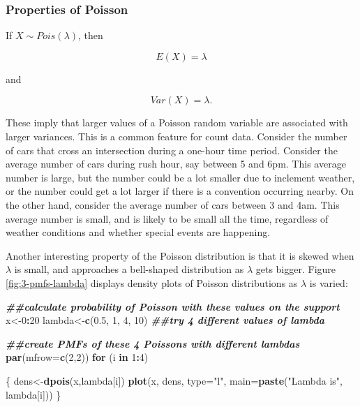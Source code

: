 \documentclass[
]{book}
\newenvironment{Shaded}{\begin{snugshade}}{\end{snugshade}}
\newcommand{\AttributeTok}[1]{\textcolor[rgb]{0.13,0.29,0.53}{#1}}
\newcommand{\ControlFlowTok}[1]{\textcolor[rgb]{0.13,0.29,0.53}{\textbf{#1}}}
\newcommand{\DecValTok}[1]{\textcolor[rgb]{0.00,0.00,0.81}{#1}}
\newcommand{\DocumentationTok}[1]{\textcolor[rgb]{0.56,0.35,0.01}{\textbf{\textit{#1}}}}
\newcommand{\FloatTok}[1]{\textcolor[rgb]{0.00,0.00,0.81}{#1}}
\newcommand{\FunctionTok}[1]{\textcolor[rgb]{0.13,0.29,0.53}{\textbf{#1}}}
\newcommand{\NormalTok}[1]{#1}
\newcommand{\OtherTok}[1]{\textcolor[rgb]{0.56,0.35,0.01}{#1}}
\newcommand{\SpecialCharTok}[1]{\textcolor[rgb]{0.81,0.36,0.00}{\textbf{#1}}}
\newcommand{\StringTok}[1]{\textcolor[rgb]{0.31,0.60,0.02}{#1}}
\begin{document}
\hypertarget{properties-of-poisson}{%
\subsubsection{Properties of Poisson}\label{properties-of-poisson}}

If \(X \sim Pois(\lambda)\), then

\begin{equation} 
E(X) = \lambda
\label{eq:3-pois-EX}
\end{equation}

and

\begin{equation} 
Var(X) = \lambda.
\label{eq:3-pois-var}
\end{equation}

These imply that larger values of a Poisson random variable are associated with larger variances. This is a common feature for count data. Consider the number of cars that cross an intersection during a one-hour time period. Consider the average number of cars during rush hour, say between 5 and 6pm. This average number is large, but the number could be a lot smaller due to inclement weather, or the number could get a lot larger if there is a convention occurring nearby. On the other hand, consider the average number of cars between 3 and 4am. This average number is small, and is likely to be small all the time, regardless of weather conditions and whether special events are happening.

Another interesting property of the Poisson distribution is that it is skewed when \(\lambda\) is small, and approaches a bell-shaped distribution as \(\lambda\) gets bigger. Figure \ref{fig:3-pmfs-lambda} displays density plots of Poisson distributions as \(\lambda\) is varied:

\begin{Shaded}
\begin{Highlighting}[]
\DocumentationTok{\#\#calculate probability of Poisson with these values on the support}
\NormalTok{x}\OtherTok{\textless{}{-}}\DecValTok{0}\SpecialCharTok{:}\DecValTok{20}
\NormalTok{lambda}\OtherTok{\textless{}{-}}\FunctionTok{c}\NormalTok{(}\FloatTok{0.5}\NormalTok{, }\DecValTok{1}\NormalTok{, }\DecValTok{4}\NormalTok{, }\DecValTok{10}\NormalTok{) }\DocumentationTok{\#\#try 4 different values of lambda}

\DocumentationTok{\#\#create PMFs of these 4 Poissons with different lambdas}
\FunctionTok{par}\NormalTok{(}\AttributeTok{mfrow=}\FunctionTok{c}\NormalTok{(}\DecValTok{2}\NormalTok{,}\DecValTok{2}\NormalTok{))}
\ControlFlowTok{for}\NormalTok{ (i }\ControlFlowTok{in} \DecValTok{1}\SpecialCharTok{:}\DecValTok{4}\NormalTok{)}
  
\NormalTok{\{}
\NormalTok{  dens}\OtherTok{\textless{}{-}}\FunctionTok{dpois}\NormalTok{(x,lambda[i])}
  \FunctionTok{plot}\NormalTok{(x, dens, }\AttributeTok{type=}\StringTok{"l"}\NormalTok{, }\AttributeTok{main=}\FunctionTok{paste}\NormalTok{(}\StringTok{"Lambda is"}\NormalTok{, lambda[i]))}
\NormalTok{\}}
\end{Highlighting}
\end{Shaded}
\end{document}
